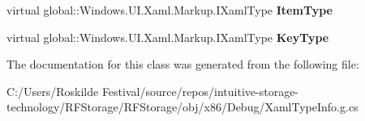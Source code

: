 \begin{DoxyCompactItemize}
\item 
\mbox{\label{class_r_f_storage_1_1_r_f_storage___xaml_type_info_1_1_xaml_system_base_type_ad6844bab354c07e237da7d4ab916b67f}} 
virtual global\+::\+Windows.\+U\+I.\+Xaml.\+Markup.\+I\+Xaml\+Type {\bfseries Item\+Type}
\item 
\mbox{\label{class_r_f_storage_1_1_r_f_storage___xaml_type_info_1_1_xaml_system_base_type_a74a99fce9aca2238dc03e92fda2be5b6}} 
virtual global\+::\+Windows.\+U\+I.\+Xaml.\+Markup.\+I\+Xaml\+Type {\bfseries Key\+Type}
\end{DoxyCompactItemize}


The documentation for this class was generated from the following file\+:\begin{DoxyCompactItemize}
\item 
C\+:/\+Users/\+Roskilde Festival/source/repos/intuitive-\/storage-\/technology/\+R\+F\+Storage/\+R\+F\+Storage/obj/x86/\+Debug/Xaml\+Type\+Info.\+g.\+cs\end{DoxyCompactItemize}
